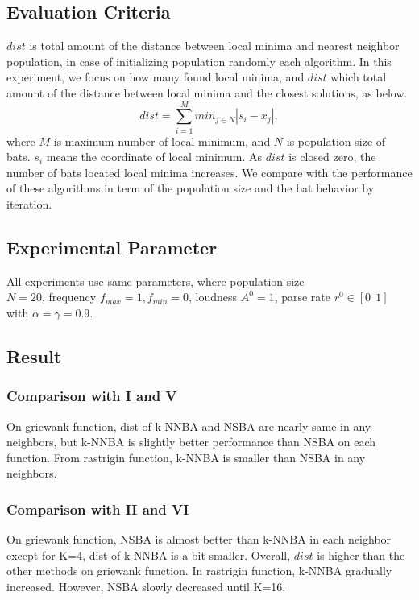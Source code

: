 \subsection{Evaluation Criteria}
$dist$ is total amount of the distance between local minima and nearest neighbor population, in case of initializing population randomly each algorithm. In this experiment, we focus on how many found local minima, and $dist$ which total amount of the distance between local minima and the closest solutions, as below. \\
\begin{equation}
dist=\sum_{i=1}^M {min_{j \in N}|s_i-x_j|},
\label{eq:dist}
\end{equation}
 where ${M}$ is maximum number of local minimum, and ${N}$ is population size of bats. ${s_i}$ means the coordinate of local minimum. As ${dist}$ is closed zero, the number of bats located local minima increases. We compare with the performance of these algorithms in term of the population size and the bat behavior by iteration. 

\subsection{Experimental Parameter}
All experiments use same parameters, where population size\\ ${N=20}$, frequency ${f_{max}=1, f_{min}=0}$, loudness ${A^0}=1$, parse rate ${r^0} \in [0 \ \ 1]$ with ${\alpha =\gamma = 0.9}$.

\subsection{Result}
 \subsubsection{Comparison with I and V}
On griewank function, dist of k-NNBA and NSBA are nearly same in any neighbors, but k-NNBA is slightly better performance than NSBA on each function. From rastrigin function, k-NNBA is smaller than NSBA in any neighbors.

\subsubsection{Comparison with II and VI}
On griewank function, NSBA is almost better than k-NNBA in each neighbor except for K=4, dist of k-NNBA is a bit smaller. Overall, ${dist}$ is higher than the other methods on griewank function. In rastrigin function, k-NNBA gradually increased. However, NSBA slowly decreased until K=16.

